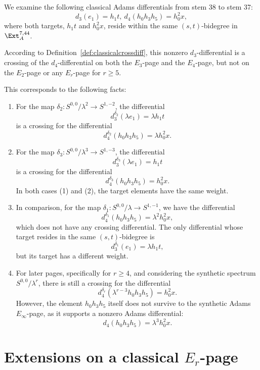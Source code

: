 \documentclass{amsart}
\numberwithin{equation}{section}
\begin{document}
\begin{example} \label{exam:classcrossdiff}
    We examine the following classical Adams differentials from stem 38 to stem 37:
    $$d_3(e_1) = h_1 t, \ d_4(h_0h_3h_5) = h_0^2 x,$$
    where both targets, $h_1 t$ and $h_0^2 x$, reside within the same $(s,t)$-bidegree in $\Ext_A^{7,44}$.

    According to Definition~\ref{def:classicalcrossdiff}, this nonzero $d_3$-differential is a crossing of the $d_4$-differential on both the $E_3$-page and the $E_4$-page, but not on the $E_2$-page or any $E_r$-page for $r \ge 5$.

    This corresponds to the following facts: 
    \begin{enumerate}
        \item For the map $\delta_2: S^{0,0}/\lambda^2 \rightarrow S^{1,-2}$, the differential
        $$d_3^{\delta_2} (\lambda e_1) = \lambda h_1 t$$
        is a crossing for the differential
        $$d_4^{\delta_2} (h_0h_3h_5) = \lambda h_0^2 x.$$

        \item For the map $\delta_3: S^{0,0}/\lambda^3 \rightarrow S^{1,-3}$, the differential
        $$d_3^{\delta_3} (\lambda e_1) = h_1 t$$
        is a crossing for the differential
        $$d_4^{\delta_3} (h_0h_3h_5) = h_0^2 x.$$
        In both cases (1) and (2), the target elements have the same weight. 

        \item In comparison, for the map $\delta_1: S^{0,0}/\lambda \rightarrow S^{1,-1}$, we have the differential
        $$d_4^{\delta_1} (h_0h_3h_5) = \lambda^2 h_0^2 x,$$
        which does not have any crossing differential. The only differential whose target resides in the same $(s,t)$-bidegree is 
        $$d_3^{\delta_1} (e_1) = \lambda h_1 t,$$
        but its target has a different weight. 

        \item For later pages, specifically for $r \ge 4$, and considering the synthetic spectrum $S^{0,0}/\lambda^r$, there is still a crossing for the differential
        $$d_4^{\delta_r} (\lambda^{r-3} h_0h_3h_5) = h_0^2 x.$$
        However, the element $h_0h_3h_5$ itself does not survive to the synthetic Adams $E_\infty$-page, as it supports a nonzero Adams differential:
        $$d_4 (h_0h_3h_5) = \lambda^3 h_0^2 x.$$
    \end{enumerate}
\end{example}

\section{Extensions on a classical $E_r$-page} \label{sec:extenpage}
\end{document}
